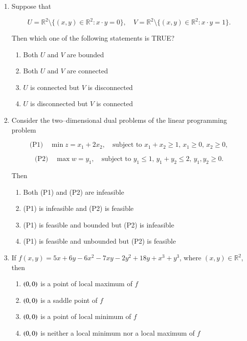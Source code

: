 \documentclass[journal,12pt,onecolumn]{IEEEtran}
\theoremstyle{remark}
\begin{document}
\begin{enumerate}[start=1, label=Q.\arabic*]
\hfill{}

\item Suppose that  

\[
U = \mathbb{R}^2 \setminus \{(x,y) \in \mathbb{R}^2 : x \cdot y = 0\}, \quad  
V = \mathbb{R}^2 \setminus \{(x,y) \in \mathbb{R}^2 : x \cdot y = 1\}.
\]

Then which one of the following statements is TRUE?  

\begin{enumerate}
\item Both $U$ and $V$ are bounded  
\item Both $U$ and $V$ are connected  
\item $U$ is connected but $V$ is disconnected  
\item $U$ is disconnected but $V$ is connected  
\end{enumerate}

\hfill{}

\item Consider the two–dimensional dual problems of the linear programming problem  

\[
\text{(P1)} \quad \min z = x_1 + 2x_2, \quad \text{subject to } x_1 + x_2 \geq 1, \, x_1 \geq 0, \, x_2 \geq 0,
\]

\[
\text{(P2)} \quad \max w = y_1, \quad \text{subject to } y_1 \leq 1, \, y_1 + y_2 \leq 2, \, y_1, y_2 \geq 0.
\]

Then  

\begin{enumerate}
\item Both (P1) and (P2) are infeasible  
\item (P1) is infeasible and (P2) is feasible  
\item (P1) is feasible and bounded but (P2) is infeasible  
\item (P1) is feasible and unbounded but (P2) is feasible  
\end{enumerate}

\hfill{}

\item If $f(x,y) = 5x + 6y - 6x^2 - 7xy - 2y^2 + 18y + x^3 + y^3$, where $(x,y) \in \mathbb{R}^2$, then  

\begin{enumerate}
\item $\left(0,0\right)$ is a point of local maximum of $f$  
\item $\left(0,0\right)$ is a saddle point of $f$  
\item $\left(0,0\right)$ is a point of local minimum of $f$  
\item $\left(0,0\right)$ is neither a local minimum nor a local maximum of $f$  
\end{enumerate}


\end{enumerate}
\end{document}
